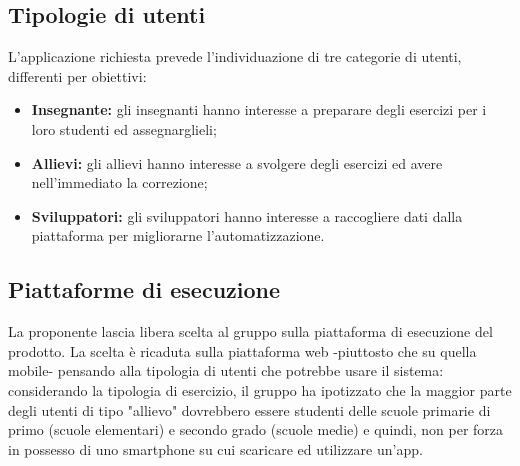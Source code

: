 \subsection{Tipologie di utenti}
L'applicazione richiesta prevede l'individuazione di tre categorie di utenti, differenti per obiettivi:
\begin{itemize}
	\item \textbf{Insegnante:} gli insegnanti hanno interesse a preparare degli esercizi per i loro studenti ed assegnarglieli;
	\item \textbf{Allievi:} gli allievi hanno interesse a svolgere degli esercizi ed avere nell'immediato la correzione;
	\item \textbf{Sviluppatori:} gli sviluppatori hanno interesse a raccogliere dati dalla piattaforma per migliorarne l'automatizzazione.
\end{itemize}

\subsection{Piattaforme di esecuzione}
	La proponente lascia libera scelta al gruppo sulla piattaforma di esecuzione del prodotto. 
La scelta è ricaduta sulla piattaforma web -piuttosto che su quella mobile- pensando alla tipologia di utenti che potrebbe usare il sistema: considerando la tipologia di esercizio, il gruppo ha ipotizzato che la maggior parte degli utenti di tipo "allievo" dovrebbero essere studenti delle scuole primarie di primo (scuole elementari) e secondo grado (scuole medie) e quindi, non per forza in possesso di uno smartphone su cui scaricare ed utilizzare un'app.
